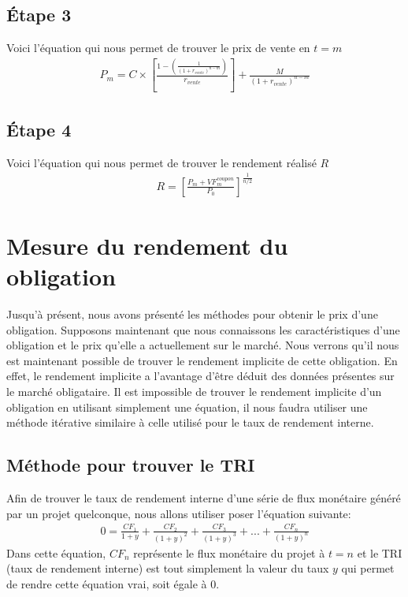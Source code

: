 \documentclass[letterpaper, 12pt]{article}
\newcommand{\1}{\mathds{1}}	%
\theoremstyle{definition}
\begin{document}
\subsection{Étape 3}
Voici l'équation qui nous permet de trouver le prix de vente en $t=m$
\begin{align*}
P_m=C \times \left[\frac{1-\left( \frac{1}{(1+r_{vente})^{n-m}}\right)}{r_{vente}} \right] +\frac{M}{(1+r_{vente})^{n-m}}
\end{align*}
\subsection{Étape 4}
Voici l'équation qui nous permet de trouver le rendement réalisé $R$
\begin{align*}
R=\left[\frac{P_m+VF_m^{coupon}}{P_0} \right]^{\frac{1}{n/2}}
\end{align*}
\section{Mesure du rendement du obligation}
Jusqu'à présent, nous avons présenté les méthodes pour obtenir le prix d'une obligation. Supposons maintenant que nous connaissons les caractéristiques d'une obligation et le prix qu'elle a actuellement sur le marché. Nous verrons qu'il nous est maintenant possible de trouver le rendement implicite de cette obligation. En effet, le rendement implicite a l'avantage d'être déduit des données présentes sur le marché obligataire. Il est impossible de trouver le rendement implicite d'un obligation en utilisant simplement une équation, il nous faudra utiliser une méthode itérative similaire à celle utilisé pour le taux de rendement interne.

\subsection{Méthode pour trouver le TRI}
Afin de trouver le taux de rendement interne d'une série de flux monétaire généré par un projet quelconque, nous allons utiliser poser l'équation suivante:
\begin{align*}
0=\frac{CF_1}{1+y}+\frac{CF_2}{(1+y)^2}+\frac{CF_3}{(1+y)^3}+...+\frac{CF_n}{(1+y)^n}
\end{align*}
Dans cette équation, $CF_n$ représente le flux monétaire du projet à $t=n$ et le TRI (taux de rendement interne) est tout simplement la valeur du taux $y$ qui permet de rendre cette équation vrai, soit égale à 0.
\end{document}
